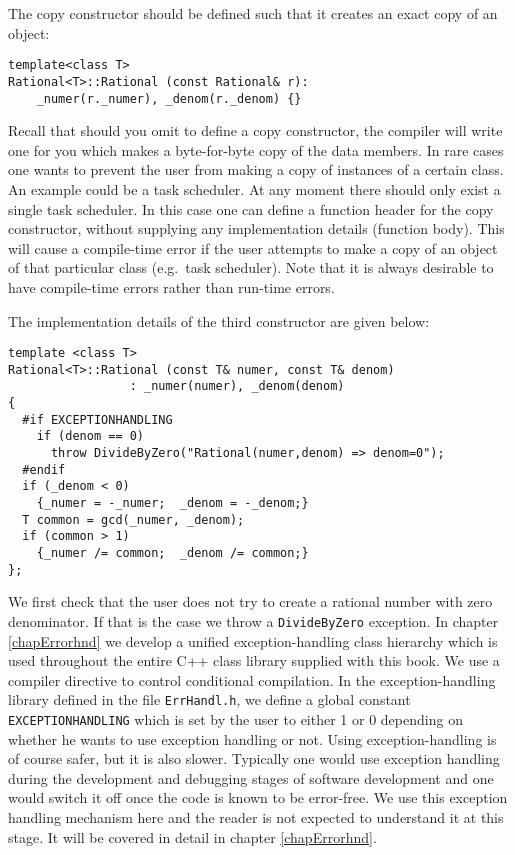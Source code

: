 The copy constructor should be defined such that it creates an exact copy of an object:
{\footnotesize \begin{verbatim}
template<class T>
Rational<T>::Rational (const Rational& r):
    _numer(r._numer), _denom(r._denom) {}
\end{verbatim}}
Recall that should you omit to define a copy constructor, the compiler will write one for
you which makes a byte-for-byte copy of the data members.
In rare cases one wants to prevent the user from making a copy of instances of a 
certain class. An example could be a task scheduler. At any moment there should only 
exist a single task scheduler. In this case one can define a function header for the copy 
constructor, without supplying any implementation details (function body). This will
cause a compile-time error if the user attempts to make a copy of an object
of that particular class (e.g.\ task scheduler). Note that it is always desirable to
have compile-time errors rather than run-time errors.

The implementation details of the third constructor are given below:
{\footnotesize \begin{verbatim}
template <class T>
Rational<T>::Rational (const T& numer, const T& denom)
                 : _numer(numer), _denom(denom)
{
  #if EXCEPTIONHANDLING
    if (denom == 0)
      throw DivideByZero("Rational(numer,denom) => denom=0");
  #endif
  if (_denom < 0)
    {_numer = -_numer;  _denom = -_denom;}
  T common = gcd(_numer, _denom);
  if (common > 1)
    {_numer /= common;  _denom /= common;}
};
\end{verbatim}}
We first check that the user does not try to create a rational
number with zero denominator. If that is the case we throw
a \verb+DivideByZero+ exception. In chapter \ref{chapErrorhnd}
we develop a unified exception-handling class hierarchy which
is used throughout the entire C++ class library supplied with
this book. We use a compiler directive to control conditional
compilation. In the exception-handling library defined in the
file \verb+ErrHandl.h+, we define a global constant
\verb+EXCEPTIONHANDLING+ which is set by the user to either
1 or 0 depending on whether he wants to use exception handling
or not. Using exception-handling is of course safer, but it is
also slower. Typically one would use exception handling during the
development and debugging stages of software development and one
would switch it off once the code is known to be error-free.
We use this exception handling mechanism here and
the reader is not expected to understand it at this stage.
It will be covered in detail in chapter \ref{chapErrorhnd}.

